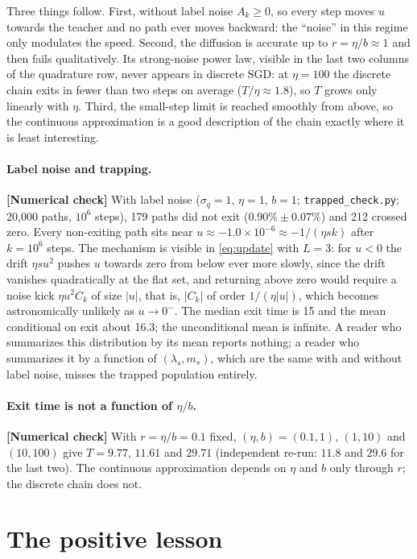 \documentclass[11pt,a4paper]{article}
\newcommand{\evl}[2]{{\small\bfseries\color{#1}[#2]}}
\newcommand{\LNum}{\evl{cnum}{Numerical check}}
\begin{document}
\noindent Three things follow. First, without label noise $A_k\ge0$, so
every step moves $u$ towards the teacher and no path ever moves backward:
the ``noise'' in this regime only modulates the speed. Second, the
diffusion is accurate up to $r=\eta/b\approx1$ and then fails
qualitatively. Its strong-noise power law, visible in the last two columns
of the quadrature row, never appears in discrete SGD: at $\eta=100$ the
discrete chain exits in fewer than two steps on average ($T/\eta\approx1.8$),
so $T$ grows only linearly with $\eta$. Third, the small-step limit is
reached smoothly from above, so the continuous approximation is a good
description of the chain exactly where it is least interesting.

\paragraph{Label noise and trapping.} \LNum{} With label noise
($\sigma_q=1$, $\eta=1$, $b=1$; \texttt{trapped\_check.py}; 20{,}000 paths,
$10^6$ steps), 179 paths did not exit ($0.90\%\pm0.07\%$) and 212 crossed
zero. Every non-exiting path sits near
$u\approx-1.0\times10^{-6}\approx-1/(\eta sk)$ after $k=10^6$ steps. The
mechanism is visible in \eqref{eq:update} with $L=3$: for $u<0$ the drift
$\eta su^2$ pushes $u$ towards zero from below ever more slowly, since the
drift vanishes quadratically at the flat set, and returning above zero
would require a noise kick $\eta u^2C_k$ of size $|u|$, that is, $|C_k|$ of
order $1/(\eta|u|)$, which becomes astronomically unlikely as $u\to0^-$.
The median exit time is 15 and the mean conditional on exit about 16.3;
the unconditional mean is infinite. A reader who summarizes this
distribution by its mean reports nothing; a reader who summarizes it by a
function of $(\lambda_s,m_s)$, which are the same with and without label
noise, misses the trapped population entirely.

\paragraph{Exit time is not a function of $\eta/b$.} \LNum{} With
$r=\eta/b=0.1$ fixed, $(\eta,b)=(0.1,1)$, $(1,10)$ and $(10,100)$ give
$T=9.77$, $11.61$ and $29.71$ (independent re-run: $11.8$ and $29.6$ for
the last two). The continuous approximation depends on $\eta$ and $b$ only
through $r$; the discrete chain does not.

\section{The positive lesson}
\label{sec:lesson}
\end{document}
